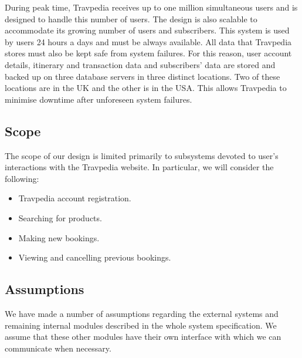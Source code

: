 During peak time, Travpedia receives up to one million simultaneous users and
is designed to handle this number of users. The design is also scalable to
accommodate its growing number of users and subscribers.  This system is used
by users 24 hours a days and must be always available.  All data that Travpedia
stores must also be kept safe from system failures. For this reason, user
account details, itinerary and transaction data and subscribers' data are
stored and backed up on three database servers in three distinct locations. Two
of these locations are in the UK and the other is in the USA. This allows
Travpedia to minimise downtime after unforeseen system failures.

\subsection{Scope}

The scope of our design is limited primarily to subsystems devoted to user's
interactions with the Travpedia website. In particular, we will consider the
following:

\begin{itemize}
	\item Travpedia account registration.
	\item Searching for products.
	\item Making new bookings.
	\item Viewing and cancelling previous bookings.
\end{itemize}

\subsection{Assumptions}

We have made a number of assumptions regarding the external systems and
remaining internal modules described in the whole system specification.  We
assume that these other modules have their own interface with which we can
communicate when necessary.


